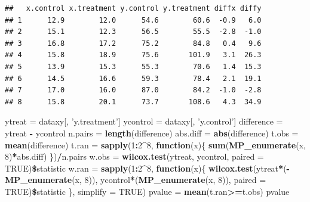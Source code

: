 \documentclass[]{article}
\newenvironment{Shaded}{\begin{snugshade}}{\end{snugshade}}
\newcommand{\KeywordTok}[1]{\textcolor[rgb]{0.13,0.29,0.53}{\textbf{#1}}}
\newcommand{\DataTypeTok}[1]{\textcolor[rgb]{0.13,0.29,0.53}{#1}}
\newcommand{\DecValTok}[1]{\textcolor[rgb]{0.00,0.00,0.81}{#1}}
\newcommand{\StringTok}[1]{\textcolor[rgb]{0.31,0.60,0.02}{#1}}
\newcommand{\OtherTok}[1]{\textcolor[rgb]{0.56,0.35,0.01}{#1}}
\newcommand{\ControlFlowTok}[1]{\textcolor[rgb]{0.13,0.29,0.53}{\textbf{#1}}}
\newcommand{\OperatorTok}[1]{\textcolor[rgb]{0.81,0.36,0.00}{\textbf{#1}}}
\newcommand{\NormalTok}[1]{#1}
\begin{document}
\begin{verbatim}
##   x.control x.treatment y.control y.treatment diffx diffy
## 1      12.9        12.0      54.6        60.6  -0.9   6.0
## 2      15.1        12.3      56.5        55.5  -2.8  -1.0
## 3      16.8        17.2      75.2        84.8   0.4   9.6
## 4      15.8        18.9      75.6       101.9   3.1  26.3
## 5      13.9        15.3      55.3        70.6   1.4  15.3
## 6      14.5        16.6      59.3        78.4   2.1  19.1
## 7      17.0        16.0      87.0        84.2  -1.0  -2.8
## 8      15.8        20.1      73.7       108.6   4.3  34.9
\end{verbatim}

\begin{Shaded}
\begin{Highlighting}[]
\NormalTok{ytreat =}\StringTok{ }\NormalTok{dataxy[, }\StringTok{'y.treatment'}\NormalTok{]}
\NormalTok{ycontrol =}\StringTok{ }\NormalTok{dataxy[, }\StringTok{'y.control'}\NormalTok{]}
\NormalTok{difference =}\StringTok{ }\NormalTok{ytreat }\OperatorTok{-}\StringTok{ }\NormalTok{ycontrol}
\NormalTok{n.pairs    =}\StringTok{ }\KeywordTok{length}\NormalTok{(difference)}
\NormalTok{abs.diff   =}\StringTok{ }\KeywordTok{abs}\NormalTok{(difference)}
\NormalTok{t.obs      =}\StringTok{ }\KeywordTok{mean}\NormalTok{(difference)}
\NormalTok{t.ran      =}\StringTok{ }\KeywordTok{sapply}\NormalTok{(}\DecValTok{1}\OperatorTok{:}\DecValTok{2}\OperatorTok{^}\DecValTok{8}\NormalTok{, }
                    \ControlFlowTok{function}\NormalTok{(x)\{ }
                      \KeywordTok{sum}\NormalTok{(}\KeywordTok{MP_enumerate}\NormalTok{(x, }\DecValTok{8}\NormalTok{)}\OperatorTok{*}\NormalTok{abs.diff) }
\NormalTok{                      \})}\OperatorTok{/}\NormalTok{n.pairs}
\NormalTok{w.obs =}\StringTok{ }\KeywordTok{wilcox.test}\NormalTok{(ytreat, ycontrol, }\DataTypeTok{paired =} \OtherTok{TRUE}\NormalTok{)}\OperatorTok{\$}\NormalTok{statistic}
\NormalTok{w.ran      =}\StringTok{ }\KeywordTok{sapply}\NormalTok{(}\DecValTok{1}\OperatorTok{:}\DecValTok{2}\OperatorTok{^}\DecValTok{8}\NormalTok{, }
                    \ControlFlowTok{function}\NormalTok{(x)\{ }
                      \KeywordTok{wilcox.test}\NormalTok{(ytreat}\OperatorTok{*}\NormalTok{(}\OperatorTok{-}\KeywordTok{MP_enumerate}\NormalTok{(x, }\DecValTok{8}\NormalTok{)), ycontrol}\OperatorTok{*}\NormalTok{(}\KeywordTok{MP_enumerate}\NormalTok{(x, }\DecValTok{8}\NormalTok{)), }\DataTypeTok{paired =} \OtherTok{TRUE}\NormalTok{)}\OperatorTok{\$}\NormalTok{statistic}
\NormalTok{                      \}, }\DataTypeTok{simplify =} \OtherTok{TRUE}\NormalTok{)}
\NormalTok{pvalue     =}\StringTok{ }\KeywordTok{mean}\NormalTok{(t.ran}\OperatorTok{>=}\NormalTok{t.obs)}
\NormalTok{pvalue}
\end{Highlighting}
\end{Shaded}
\end{document}
